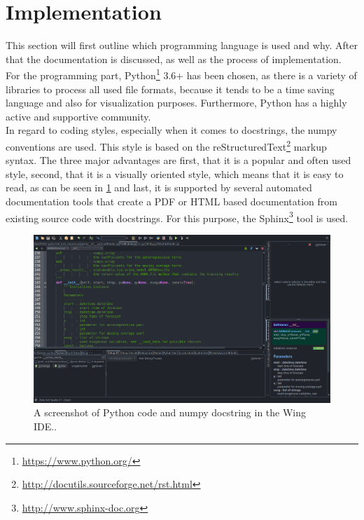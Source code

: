\section{Implementation}
\label{sec:prog}

This section will first outline which programming language is used and why. After that the documentation is discussed, as well as the process of implementation.\\

For the programming part, Python\footnote{\url{https://www.python.org/}} 3.6+ has been chosen, as there is a variety of libraries to process all used file formats, because it tends to be a time saving language and also for visualization purposes. Furthermore, Python has a highly active and supportive community.\\

In regard to coding styles, especially when it comes to docstrings, the numpy conventions are used. This style is based on the reStructuredText\footnote{\url{http://docutils.sourceforge.net/rst.html}} markup syntax. The three major advantages are first, that it is a popular and often used style, second, that it is a visually oriented style, which means that it is easy to read, as can be seen in \cref{fig:wing_docstrings} and last, it is supported by several automated documentation tools that create a PDF or HTML based documentation from existing source code with docstrings. For this purpose, the Sphinx\footnote{\url{http://www.sphinx-doc.org}} tool is used.\\

\begin{figure}[h!]%
\centering
\includegraphics[width=\textwidth]{logos/Predictions_Wing_001}%
\caption[A screenshot of Python code and numpy docstring in the Wing IDE.]{A screenshot of Python code and numpy docstring in the Wing IDE.\footnotemark.}%
\label{fig:wing_docstrings}%
\end{figure}

